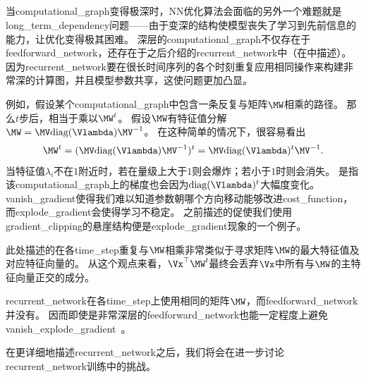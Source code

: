 \subsection{}
\label{sec:long_term_dependencies}
当\gls{computational_graph}变得极深时，\gls{NN}优化算法会面临的另外一个难题就是\gls{long_term_dependency}问题——由于变深的结构使模型丧失了学习到先前信息的能力，让优化变得极其困难。 
深层的\gls{computational_graph}不仅存在于\gls{feedforward_network}，还存在于之后介绍的\gls{recurrent_network}中（在中描述）。
因为\gls{recurrent_network}要在很长时间序列的各个时刻重复应用相同操作来构建非常深的计算图，并且模型参数共享，这使问题更加凸显。


例如，假设某个\gls{computational_graph}中包含一条反复与矩阵$\MW$相乘的路径。
那么$t$步后，相当于乘以$\MW^t$。
假设$\MW$有特征值分解$\MW = \MV \text{diag}(\Vlambda) \MV^{-1}$。
在这种简单的情况下，很容易看出
\begin{equation}
  \MW^t = (\MV \text{diag}(\Vlambda) \MV^{-1})^t = \MV\text{diag}(\Vlambda)^t  \MV^{-1}.
\end{equation}
当特征值$\lambda_i$不在$1$附近时，若在量级上大于$1$则会爆炸；若小于$1$时则会消失。
是指该\gls{computational_graph}上的梯度也会因为$\text{diag}(\Vlambda)^t$大幅度变化。
\gls{vanish_gradient}使得我们难以知道参数朝哪个方向移动能够改进\gls{cost_function}，而\gls{explode_gradient}会使得学习不稳定。
之前描述的促使我们使用\gls{gradient_clipping}的悬崖结构便是\gls{explode_gradient}现象的一个例子。


此处描述的在各\gls{time_step}重复与$\MW$相乘非常类似于寻求矩阵$\MW$的最大特征值及对应特征向量的。
从这个观点来看，$\Vx^\top\MW^t$最终会丢弃$\Vx$中所有与$\MW$的主特征向量正交的成分。


\gls{recurrent_network}在各\gls{time_step}上使用相同的矩阵$\MW$，而\gls{feedforward_network}并没有。
因而即使是非常深层的\gls{feedforward_network}也能一定程度上避免\gls{vanish_explode_gradient}~\citep{Sussillo-2014}。


在更详细地描述\gls{recurrent_network}之后，我们将会在进一步讨论\gls{recurrent_network}训练中的挑战。


